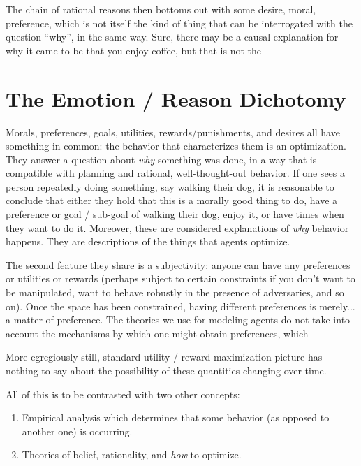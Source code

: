 \documentclass{book}
\begin{document}
	The chain of rational reasons then bottoms out with some desire, moral, preference, which is not itself the kind of thing that can be interrogated with the question ``why'', in the same way. Sure, there may be a causal explanation for why it came to be that you enjoy coffee, but that is not the 
	
	
			
	
	
	
	
	\section{The Emotion / Reason Dichotomy}
	Morals, preferences, goals, utilities, rewards/punishments, and desires all have something in common: the behavior that characterizes them is an optimization. They answer a question about \emph{why} something was done, in a way that is compatible with planning and rational, well-thought-out behavior. If one sees a person repeatedly doing something, say walking their dog, it is reasonable to conclude that either they hold that this is a morally good thing to do, have a preference or goal / sub-goal of walking their dog, enjoy it, or have times when they want to do it. Moreover, these are considered explanations of \emph{why} behavior happens. They are descriptions of the things that agents optimize.
	
	The second feature they share is a subjectivity: anyone can have any preferences or utilities or rewards (perhaps subject to certain constraints if you don't want to be manipulated, want to behave robustly in the presence of adversaries, and so on). Once the space has been constrained, having different preferences is merely... a matter of preference. The theories we use for modeling agents do not take into account the mechanisms by which one might obtain preferences, which 
	
	More egregiously still, standard utility / reward maximization picture has nothing to say about the possibility of these quantities changing over time.
	
	
	
	All of this is to be contrasted with two other concepts:

	\begin{enumerate}
		\item Empirical analysis which determines that some behavior (as opposed to another one) is occurring. 
		\item Theories of belief, rationality, and \emph{how} to optimize.
	\end{enumerate}
	
\end{document}
